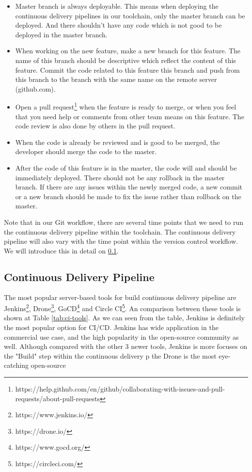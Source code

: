 \begin{itemize}
    \item Master branch is always deployable. This means when deploying the continuous delivery pipelines in our toolchain, only the master branch can be deployed. And there shouldn't have any code which is not good to be deployed in the master branch. 
    \item When working on the new feature, make a new branch for this feature. The name of this branch should be descriptive which reflect the content of this feature. Commit the code related to this feature this branch and push from this branch to the branch with the same name on the remote server (github.com).
    \item Open a pull request\footnote{https://help.github.com/en/github/collaborating-with-issues-and-pull-requests/about-pull-requests} when the feature is ready to merge, or when you feel that you need help or comments from other team means on this feature. The code review is also done by others in the pull request.
    \item When the code is already be reviewed and is good to be merged, the developer should merge the code to the master.
    \item After the code of this feature is in the master, the code will and should be immediately deployed. There should not be any rollback in the master branch. If there are any issues within the newly merged code, a new commit or a new branch should be made to fix the issue rather than rollback on the master.
\end{itemize}
\par
Note that in our Git workflow, there are several time points that we need to run the continuous delivery pipeline within the toolchain. The continuous delivery pipeline will also vary with the time point within the version control workflow. We will introduce this in detail on \ref{our-ci}.
\subsection{Continuous Delivery Pipeline}
\label{our-ci}
The most popular server-based tools for build continuous delivery pipeline are Jenkins\footnote{https://www.jenkins.io/}, Drone\footnote{https://drone.io/}, GoCD\footnote{https://www.gocd.org/} and Circle CI\footnote{https://circleci.com/}. An comparison between these tools is shown at Table \ref{tab:ci-tools}. As we can seen from the table, Jenkins is definitely the most popular option for CI/CD. Jenkins has wide application in the commercial use case, and the high popularity in the open-source community as well. Although compared with the other 3 newer tools, Jenkins is more focuses on the "Build" step within the continuous delivery p the     Drone is the most eye-catching open-source

